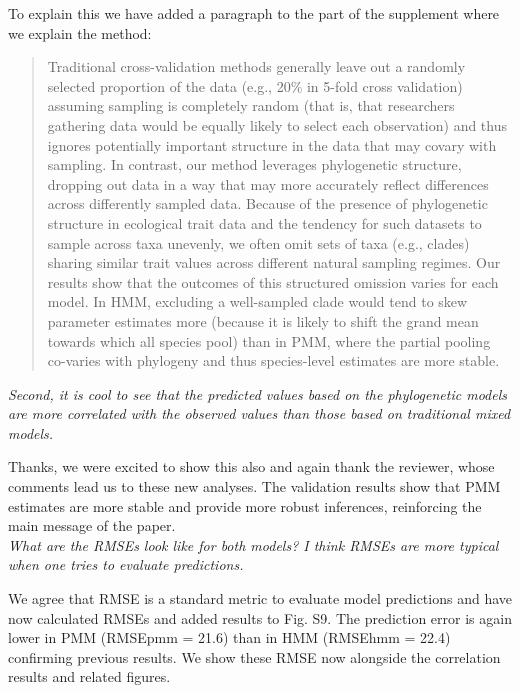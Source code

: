 \documentclass[11pt]{article}
\begin{document}
To explain this we have added a paragraph to the part of the supplement where we explain the method:

\begin{quote}
Traditional cross-validation methods generally leave out a randomly selected proportion of the data (e.g., 20\% in 5-fold cross validation) assuming sampling is completely random (that is, that researchers gathering data would be equally likely to select each observation) and thus ignores potentially important structure in the data that may covary with sampling. In contrast, our method leverages phylogenetic structure, dropping out data in a way that may more accurately reflect differences across differently sampled data. Because of the presence of phylogenetic structure in ecological trait data and the tendency for such datasets to sample across taxa unevenly, we often omit sets of taxa (e.g., clades) sharing similar trait values across different natural sampling regimes. Our results show that the outcomes of this structured omission varies for each model. In HMM, excluding a well-sampled clade would tend to skew parameter estimates more (because it is likely to shift the grand mean towards which all species pool) than in PMM, where the partial pooling co-varies with phylogeny and thus species-level estimates are more stable. 
\end{quote} 


\emph{Second, it is cool to see that the predicted values based on the phylogenetic models are more correlated with the observed values than those based on traditional mixed models. }

Thanks, we were excited to show this also and again thank the reviewer, whose comments lead us to these new analyses. The validation results show that PMM estimates are more stable and provide more robust inferences, reinforcing the main message of the paper.\\


\emph{What are the RMSEs look like for both models? I think RMSEs are more typical when one tries to evaluate predictions. }

We agree that RMSE is a standard metric to evaluate model predictions and have now calculated RMSEs and added results to Fig. S9. The prediction error is again lower in PMM (RMSEpmm = 21.6) than in HMM (RMSEhmm = 22.4) confirming previous results. We show these RMSE now alongside the correlation results and related figures. \\
\end{document}

